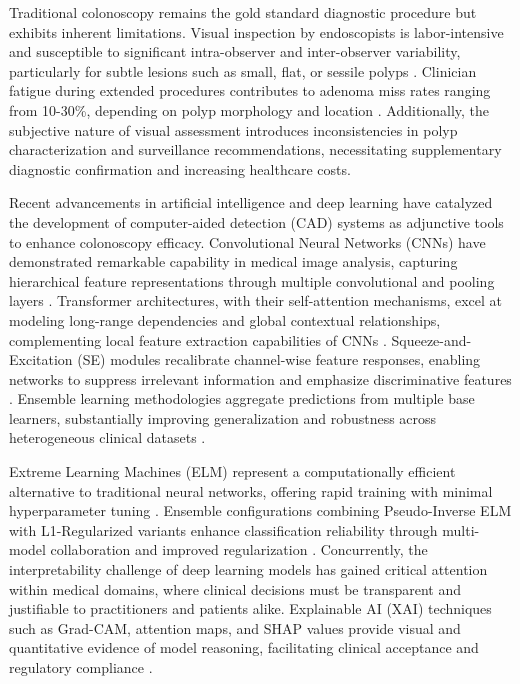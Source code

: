 \documentclass[11pt,a4paper]{article}
\begin{document}
Traditional colonoscopy remains the gold standard diagnostic procedure but exhibits inherent limitations. Visual inspection by endoscopists is labor-intensive and susceptible to significant intra-observer and inter-observer variability, particularly for subtle lesions such as small, flat, or sessile polyps \cite{ref3}. Clinician fatigue during extended procedures contributes to adenoma miss rates ranging from 10-30\%, depending on polyp morphology and location \cite{ref4}. Additionally, the subjective nature of visual assessment introduces inconsistencies in polyp characterization and surveillance recommendations, necessitating supplementary diagnostic confirmation and increasing healthcare costs.

Recent advancements in artificial intelligence and deep learning have catalyzed the development of computer-aided detection (CAD) systems as adjunctive tools to enhance colonoscopy efficacy. Convolutional Neural Networks (CNNs) have demonstrated remarkable capability in medical image analysis, capturing hierarchical feature representations through multiple convolutional and pooling layers \cite{ref5}. Transformer architectures, with their self-attention mechanisms, excel at modeling long-range dependencies and global contextual relationships, complementing local feature extraction capabilities of CNNs \cite{ref6}. Squeeze-and-Excitation (SE) modules recalibrate channel-wise feature responses, enabling networks to suppress irrelevant information and emphasize discriminative features \cite{ref7}. Ensemble learning methodologies aggregate predictions from multiple base learners, substantially improving generalization and robustness across heterogeneous clinical datasets \cite{ref8}.

Extreme Learning Machines (ELM) represent a computationally efficient alternative to traditional neural networks, offering rapid training with minimal hyperparameter tuning \cite{ref9}. Ensemble configurations combining Pseudo-Inverse ELM with L1-Regularized variants enhance classification reliability through multi-model collaboration and improved regularization \cite{ref10}. Concurrently, the interpretability challenge of deep learning models has gained critical attention within medical domains, where clinical decisions must be transparent and justifiable to practitioners and patients alike. Explainable AI (XAI) techniques such as Grad-CAM, attention maps, and SHAP values provide visual and quantitative evidence of model reasoning, facilitating clinical acceptance and regulatory compliance \cite{ref11}.
\end{document}
